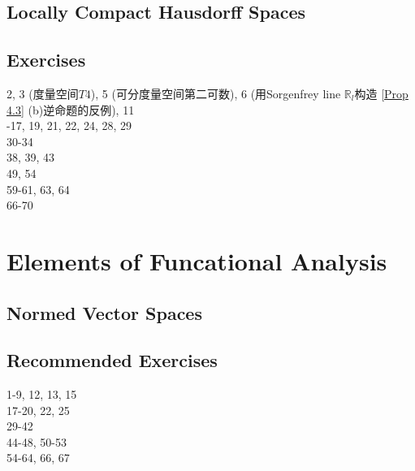 \documentclass[hidelinks]{article}
\theoremstyle{definition}
\theoremstyle{plain}
\theoremstyle{remark}
\begin{document}
\subsection{Locally Compact Hausdorff Spaces}






\subsection{Exercises}
2, 3 (度量空间$T4$), 5 (可分度量空间第二可数), 6 (用Sorgenfrey line $\mathbb{R}_l$构造 \autoref{Prop 4.3} (b)逆命题的反例), 11 \\
-17, 19, 21, 22, 24, 28, 29 \\
30-34 \\
38, 39, 43 \\
49, 54 \\
59-61, 63, 64 \\
66-70 \\
\newpage


\section{Elements of Funcational Analysis}

\subsection{Normed Vector Spaces}










\subsection{Recommended Exercises}
1-9, 12, 13, 15 \\
17-20, 22, 25 \\
29-42 \\
44-48, 50-53 \\
54-64, 66, 67 \\
\end{document}
